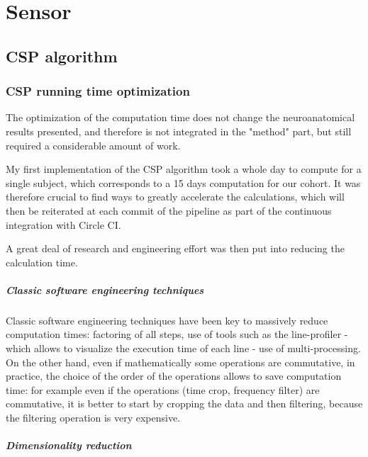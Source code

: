
\chapter{Sensor}


\section{CSP algorithm}

\subsection{CSP running time optimization}
\label{Sec:running_time_optimisation}

The optimization of the computation time does not change the neuroanatomical results presented, and therefore is not integrated in the "method" part, but still required a considerable amount of work.

My first implementation of the CSP algorithm took a whole day to compute for a single subject, which corresponds to a 15 days computation for our cohort. It was therefore crucial to find ways to greatly accelerate the calculations, which will then be reiterated at each commit of the pipeline as part of the continuous integration with Circle CI.

A great deal of research and engineering effort was then put into reducing the calculation time.

\paragraph{Classic software engineering techniques}

Classic software engineering techniques have been key to massively reduce computation times: factoring of all steps, use of tools such as the line-profiler - which allows to visualize the execution time of each line -  use of multi-processing. On the other hand, even if mathematically some operations are commutative, in practice, the choice of the order of the operations allows to save computation time: for example even if the operations (time crop, frequency filter) are commutative, it is better to start by cropping the data and then filtering, because the filtering operation is very expensive.

\paragraph{Dimensionality reduction}


